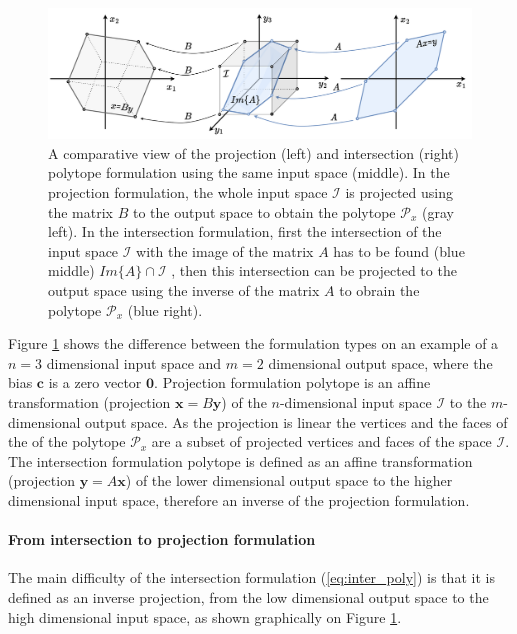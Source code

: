 \begin{figure}
    \centering
    \includegraphics[width=\linewidth]{Chapters/imgs/intersection_projection.pdf}
    \caption{A comparative view of the projection (left) and intersection (right) polytope formulation using the same input space (middle). In the projection formulation, the whole input space $\mathcal{I}$ is projected using the matrix $B$ to the output space to obtain the polytope $\mathcal{P}_x$ (gray left). In the intersection formulation, first the intersection of the input space $\mathcal{I}$ with the image of the matrix $A$ has to be found (blue middle) $Im\{A\} \cap \mathcal{I}$ , then this intersection can be projected to the output space using the inverse of the matrix $A$ to obrain the polytope $\mathcal{P}_x$ (blue right).}
    \label{fig:inter_proj}
\end{figure}

Figure \ref{fig:inter_proj} shows the difference between the formulation types on an example of a $n=3$ dimensional input space and $m=2$ dimensional output space, where the bias $\bm{c}$ is a zero vector $\bm{0}$.
Projection formulation polytope is an affine transformation (projection $\bm{x}=B\bm{y}$) of the $n$-dimensional input space $\mathcal{I}$ to the $m$-dimensional output space. As the projection is linear the vertices and the faces of the of the polytope $\mathcal{P}_x$ are a subset of projected vertices and faces of the space $\mathcal{I}$. The intersection formulation polytope is defined as an affine transformation (projection $\bm{y}=A\bm{x}$) of the  lower dimensional output space to the higher dimensional input space, therefore an inverse of the projection formulation.

\paragraph*{From intersection to projection formulation} The main difficulty of the intersection formulation (\ref{eq:inter_poly}) is that it is defined as an inverse projection, from the low dimensional output space to the high dimensional input space, as shown graphically on Figure \ref{fig:inter_proj}. 

